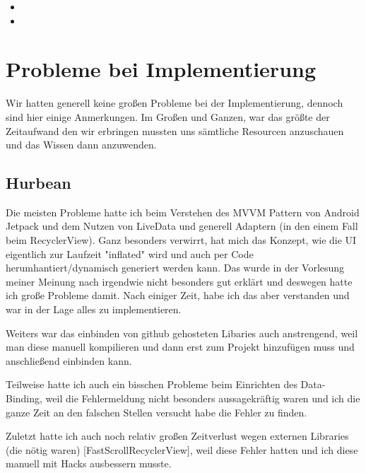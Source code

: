 \documentclass{mrtrash}
\begin{document}
\lorem \lorem

\begin{itemize}
    \item \lorem
    \item \lorem
\end{itemize}

\begin{minipage}[t]{\textwidth}
    \centering
\end{minipage}

\section{Probleme bei Implementierung}

Wir hatten generell keine großen Probleme bei der Implementierung, dennoch sind hier einige Anmerkungen. Im Großen und Ganzen, war das größte der Zeitaufwand den wir erbringen mussten uns sämtliche Resourcen anzuschauen und das Wissen dann anzuwenden.

\subsection{Hurbean}

Die meisten Probleme hatte ich beim Verstehen des MVVM Pattern von Android Jetpack und dem Nutzen von LiveData und generell Adaptern (in den einem Fall beim RecyclerView). Ganz besonders verwirrt, hat mich das Konzept, wie die UI eigentlich zur Laufzeit "inflated" wird und auch per Code herumhantiert/dynamisch generiert werden kann. Das wurde in der Vorlesung meiner Meinung nach irgendwie nicht besonders gut erklärt und deswegen hatte ich große Probleme damit. Nach einiger Zeit, habe ich das aber verstanden und war in der Lage alles zu implementieren.

Weiters war das einbinden von github gehosteten Libaries auch anstrengend, weil man diese manuell kompilieren und dann erst zum Projekt hinzufügen muss und anschließend einbinden kann.

Teilweise hatte ich auch ein bisschen Probleme beim Einrichten des Data-Binding, weil die Fehlermeldung nicht besonders aussagekräftig waren und ich die ganze Zeit an den falschen Stellen versucht habe die Fehler zu finden.

Zuletzt hatte ich auch noch relativ großen Zeitverlust wegen externen Libraries (die nötig waren) [FastScrollRecyclerView], weil diese Fehler hatten und ich diese manuell mit Hacks ausbessern musste.
\end{document}

